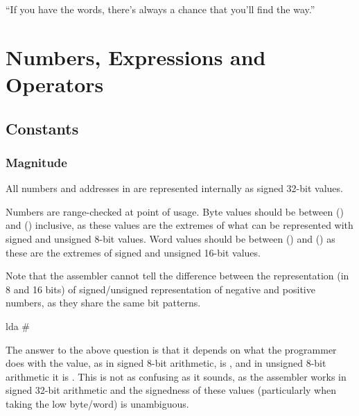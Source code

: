 \begin{savequote}
\sffamily
``If you have the words, there's always a chance that you'll find the way.''
\end{savequote}

\chapter{Numbers, Expressions and Operators}

\section{Constants}
\label{section:numberformat}

\label{changelog:20200905range}
\subsection{Magnitude}
All numbers and addresses in \dasm are represented internally as signed 32-bit values.

Numbers are range-checked at point of usage. Byte values should be between  () and  () inclusive, as these values are the extremes of what can be represented with signed and unsigned 8-bit values. Word values should be between  () and  () as these are the extremes of signed and unsigned 16-bit values.

Note that the assembler cannot tell the difference between the representation (in 8 and 16 bits) of signed/unsigned representation of negative and positive numbers, as they share the same bit patterns. 

\begin{code}
 lda #%
\end{code}

The answer to the above question is that it depends on what the programmer does with the value, as in signed 8-bit arithmetic,  is , and in unsigned 8-bit arithmetic it is . This is not as confusing as it sounds, as the assembler works in signed 32-bit arithmetic and the signedness of these values (particularly when taking the low byte/word) is unambiguous.

